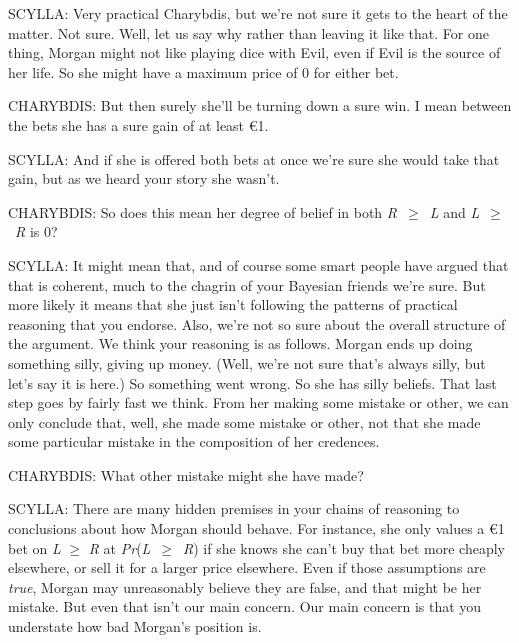 \documentclass[
  11pt,
  letterpaper,
  DIV=11,
  numbers=noendperiod,
  oneside]{scrartcl}
\begin{document}
SCYLLA: Very practical Charybdis, but we're not sure it gets to the
heart of the matter. Not sure. Well, let us say why rather than leaving
it like that. For one thing, Morgan might not like playing dice with
Evil, even if Evil is the source of her life. So she might have a
maximum price of 0 for either bet.

CHARYBDIS: But then surely she'll be turning down a sure win. I mean
between the bets she has a sure gain of at least €1.

SCYLLA: And if she is offered both bets at once we're sure she would
take that gain, but as we heard your story she wasn't.

CHARYBDIS: So does this mean her degree of belief in both
\emph{R}~\({\geq}\)~\emph{L} and \emph{L}~\({\geq}\)~\emph{R} is 0?

SCYLLA: It might mean that, and of course some smart people have argued
that that is coherent, much to the chagrin of your Bayesian friends
we're sure. But more likely it means that she
just isn't following the patterns of practical reasoning that you
endorse. Also, we're not so sure
about the overall structure of the argument. We think your reasoning is
as follows. Morgan ends up doing something silly, giving up money.
(Well, we're not sure that's always silly, but let's say it is here.) So
something went wrong. So she has silly beliefs. That last step goes by
fairly fast we think. From her making some mistake or other, we can only
conclude that, well, she made some mistake or other, not that she made
some particular mistake in the composition of her credences.

CHARYBDIS: What other mistake might she have made?

SCYLLA: There are many hidden premises in your chains of reasoning to
conclusions about how Morgan should behave. For instance, she only
values a €1 bet on \emph{L} \({\geq}\) \emph{R} at
\emph{Pr}(\emph{L}~\({\geq}\)~\emph{R}) if she knows she can't buy that
bet more cheaply elsewhere, or sell it for a larger price elsewhere.
Even if those assumptions are \emph{true}, Morgan may unreasonably
believe they are false, and that might be her mistake.
But even that isn't our main concern. Our main concern is that you
understate how bad Morgan's position is.
\end{document}
